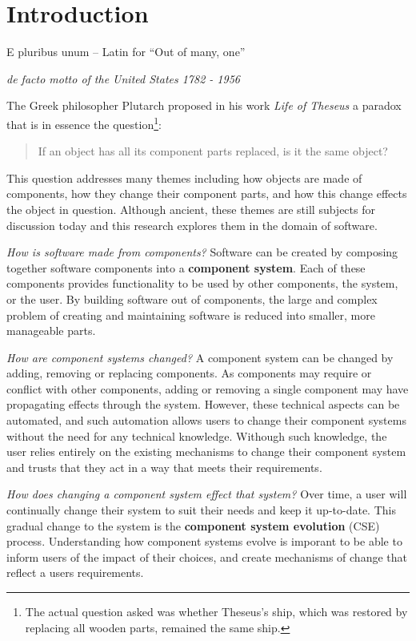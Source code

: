 \chapter{Introduction}
\label{introduction}
\epigraph{E pluribus unum -- Latin for ``Out of many, one''}
{\textit{de facto motto of the United States 1782 - 1956}}
The Greek philosopher Plutarch proposed in his work \textit{Life of Theseus} a paradox that is in essence the question\footnote{The actual question asked was whether Theseus's ship, which was restored by replacing all wooden parts, remained the same ship.}:
\begin{quote}
If an object has all its component parts replaced, is it the same object?
\end{quote}
This question addresses many themes including how objects are made of components, how they change their component parts,
and how this change effects the object in question.
Although ancient, 
these themes are still subjects for discussion today and this research explores them in the domain of software.

\textit{How is software made from components?}
Software can be created by composing together software components \citep{Szyperski2002} into a \textbf{component system}.
Each of these components provides functionality to be used by other components, the system, or the user.
By building software out of components, the large and complex problem of creating and maintaining software is reduced into smaller, more manageable parts.

\textit{How are component systems changed?}
A component system can be changed by adding, removing or replacing components.
As components may require or conflict with other components, adding or removing a single component may have propagating effects through the system.
However, these technical aspects can be automated, and such automation allows users to change their component systems without the need for any technical knowledge.
Withough such knowledge, the user relies entirely on the existing mechanisms to change their component system and trusts that they act in a way that meets their requirements.

\textit{How does changing a component system effect that system?}
Over time, a user will continually change their system to suit their needs and keep it up-to-date.
This gradual change to the system is the \textbf{component system evolution} (CSE) process.
Understanding how component systems evolve is imporant to be able to inform users of the impact of their choices, 
and create mechanisms of change that reflect a users requirements.

